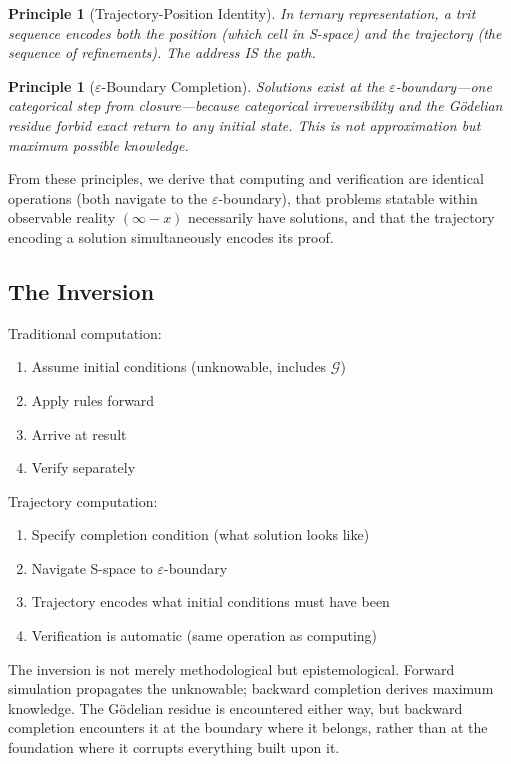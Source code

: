 \documentclass[twocolumn,10pt]{article}
\newtheorem{principle}[theorem]{Principle}
\theoremstyle{remark}
\newcommand{\eps}{\varepsilon}
\newcommand{\Gres}{\mathcal{G}}
\begin{document}
\begin{principle}[Trajectory-Position Identity]
\label{prin:identity}
In ternary representation, a trit sequence encodes both the position (which cell in S-space) and the trajectory (the sequence of refinements). The address IS the path.
\end{principle}

\begin{principle}[$\eps$-Boundary Completion]
\label{prin:epsilon}
Solutions exist at the $\eps$-boundary---one categorical step from closure---because categorical irreversibility and the Gödelian residue forbid exact return to any initial state. This is not approximation but maximum possible knowledge.
\end{principle}

From these principles, we derive that computing and verification are identical operations (both navigate to the $\eps$-boundary), that problems statable within observable reality $(\infty - x)$ necessarily have solutions, and that the trajectory encoding a solution simultaneously encodes its proof.

\subsection{The Inversion}

Traditional computation:
\begin{enumerate}
    \item Assume initial conditions (unknowable, includes $\Gres$)
    \item Apply rules forward
    \item Arrive at result
    \item Verify separately
\end{enumerate}

Trajectory computation:
\begin{enumerate}
    \item Specify completion condition (what solution looks like)
    \item Navigate S-space to $\eps$-boundary
    \item Trajectory encodes what initial conditions must have been
    \item Verification is automatic (same operation as computing)
\end{enumerate}

The inversion is not merely methodological but epistemological. Forward simulation propagates the unknowable; backward completion derives maximum knowledge. The Gödelian residue is encountered either way, but backward completion encounters it at the boundary where it belongs, rather than at the foundation where it corrupts everything built upon it.
\end{document}
